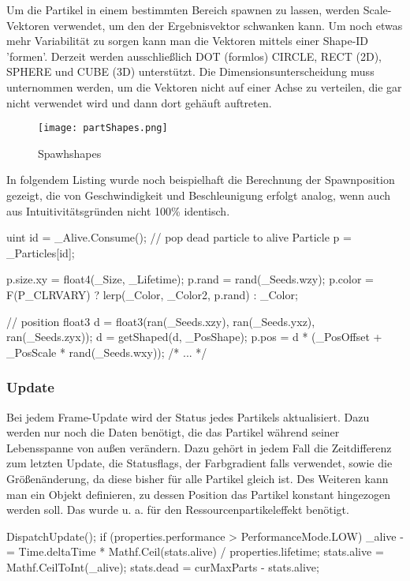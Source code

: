 Um die Partikel in einem bestimmten Bereich spawnen zu lassen, werden Scale-Vektoren verwendet, um den der Ergebnisvektor schwanken kann. Um noch etwas mehr Variabilität zu sorgen kann man die Vektoren mittels einer Shape-ID 'formen'. Derzeit werden ausschlie{\ss}lich DOT (formlos) CIRCLE, RECT (2D), SPHERE und CUBE (3D) unterstützt. Die Dimensionsunterscheidung muss unternommen werden, um die Vektoren nicht auf einer Achse zu verteilen, die gar nicht verwendet wird und dann dort gehäuft auftreten.

\begin{figure}[H]
\centering
\texttt{[image: partShapes.png]}
\caption{Spawhshapes}
\label{img:partShapes}
\end{figure}

In folgendem Listing wurde noch beispielhaft die Berechnung der Spawnposition gezeigt, die von Geschwindigkeit und Beschleunigung erfolgt analog, wenn auch aus Intuitivitätsgründen nicht 100\% identisch.

\begin{hlsl}[caption=Compute Emit Kernel]
uint id = _Alive.Consume(); // pop dead particle to alive
Particle p = _Particles[id];

p.size.xy = float4(_Size, _Lifetime);
p.rand = rand(_Seeds.wzy);
p.color = F(P_CLRVARY) ? lerp(_Color, _Color2, p.rand) : _Color;

// position
float3 d = float3(ran(_Seeds.xzy), ran(_Seeds.yxz), ran(_Seeds.zyx));
d = getShaped(d, _PosShape);
p.pos = d * (_PosOffset + _PosScale * rand(_Seeds.wxy));
/* ... */
\end{hlsl}


\subsubsection{Update}

Bei jedem Frame-Update wird der Status jedes Partikels aktualisiert. Dazu werden nur noch die Daten benötigt, die das Partikel während seiner Lebensspanne von au{\ss}en verändern. Dazu gehört in jedem Fall die Zeitdifferenz zum letzten Update, die Statusflags, der Farbgradient falls verwendet, sowie die Grö{\ss}enänderung, da diese bisher für alle Partikel gleich ist. Des Weiteren kann man ein Objekt definieren, zu dessen Position das Partikel konstant hingezogen werden soll. Das wurde u. a. für den Ressourcenpartikeleffekt benötigt.

\begin{csh}[caption=Controller Update]
DispatchUpdate();
if (properties.performance > PerformanceMode.LOW)
{
    _alive -= Time.deltaTime * Mathf.Ceil(stats.alive) / properties.lifetime;
    stats.alive = Mathf.CeilToInt(_alive);
    stats.dead = curMaxParts - stats.alive;
}
\end{csh}

